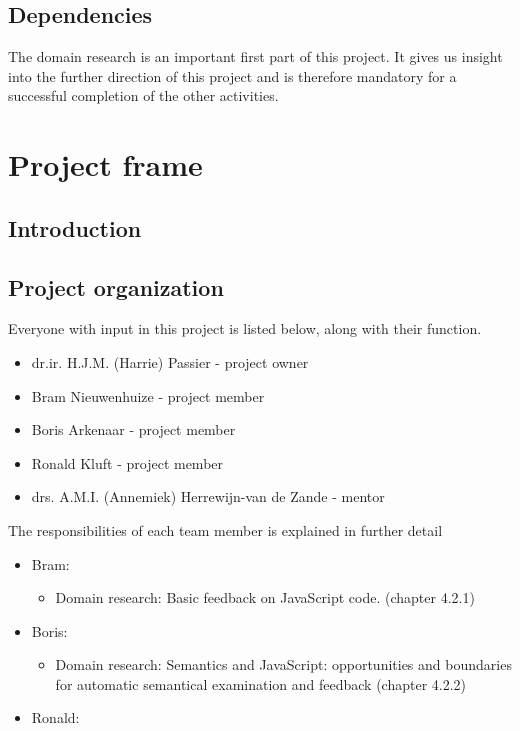 \documentclass{article}
\begin{document}
\subsection{Dependencies} 

The domain research is an important first part of this project. It 
gives us insight into the further direction of this project and is therefore 
mandatory for a successful completion of the other activities. 

\section{Project frame} 

\subsection{Introduction} 
 
\subsection{Project organization} 

Everyone with input in this 
project is listed below, along with their function.
\begin{itemize}
  \item dr.ir.  H.J.M. (Harrie) Passier - project owner
  \item Bram Nieuwenhuize - project member
  \item Boris Arkenaar - project member
  \item Ronald Kluft - project member
  \item drs. A.M.I. (Annemiek) Herrewijn-van de Zande - mentor
\end{itemize}
The responsibilities of each team member is explained in further detail
\begin{itemize}
  \item Bram:
    \begin{itemize}
      \item Domain research: Basic feedback on JavaScript code. (chapter
        4.2.1)
    \end{itemize}
  \item Boris:
    \begin{itemize}
      \item Domain research: Semantics and JavaScript: opportunities and
        boundaries for automatic semantical examination and feedback (chapter
        4.2.2)
    \end{itemize}
  \item Ronald:
\end{itemize}
\end{document}
